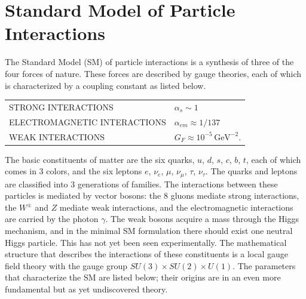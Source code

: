 
\chapter{Standard Model of Particle Interactions}

The Standard Model (SM) of particle interactions is a synthesis of three
of the four forces of nature. These forces are described by gauge
theories, each of which is characterized by a coupling constant as listed
below.

\begin{center}
\begin{tabular}{ll}
STRONG INTERACTIONS & $\alpha_s \sim 1$ \\
ELECTROMAGNETIC INTERACTIONS & $\alpha_{em} \approx 1/137$ \\
WEAK INTERACTIONS & $G_F \approx 10^{-5}\,\mathrm{GeV}^{-2}$.
\end{tabular}
\end{center}

The basic constituents of matter are the six quarks, $u$, $d$, $s$, $c$,
$b$, $t$, each of which comes in 3 colors, and the six leptons $e$,
$\nu_e$, $\mu$, $\nu_\mu$, $\tau$, $\nu_\tau$. The quarks and leptons are
classified into 3 generations of families. The interactions between these
particles is mediated by vector bosons: the 8 gluons mediate strong
interactions, the $W^\pm$ and $Z$ mediate weak interactions, and the
electromagnetic interactions are carried by the photon $\gamma$. The weak
bosons acquire a mass through the Higgs mechanism, and in the minimal SM
formulation there should exist one neutral Higgs particle. This has not yet
been seen experimentally. The mathematical structure that describes the
interactions of these constituents is a local gauge field theory with the
gauge group $SU(3) \times SU(2) \times U(1)$. The parameters that
characterize the SM are listed below; their origins are in an even more
fundamental but as yet undiscovered theory.

